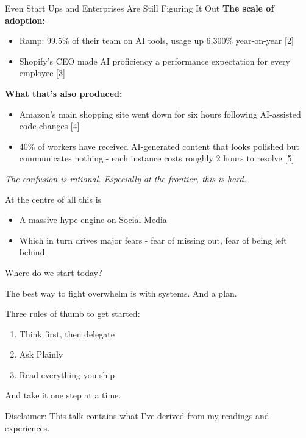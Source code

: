 \documentclass{beamer}
\begin{document}
\begin{frame}{Even Start Ups and Enterprises Are Still Figuring It Out}
\textbf{The scale of adoption:}
\begin{itemize}
    \item Ramp: 99.5\% of their team on AI tools, usage up 6,300\% year-on-year [2]
    \item Shopify's CEO made AI proficiency a performance expectation for every employee [3]
\end{itemize}

\vspace{1em}
\textbf{What that's also produced:}
\begin{itemize}
    \item Amazon's main shopping site went down for six hours following AI-assisted code changes [4]
    \item 40\% of workers have received AI-generated content that looks polished but communicates nothing - each instance costs roughly 2 hours to resolve [5]
\end{itemize}

\vspace{0.8em}
\textit{The confusion is rational. Especially at the frontier, this is hard.}
\end{frame}

\begin{frame}{At the centre of all this is}

\pause
\begin{itemize}
    \item    A massive hype engine on Social Media
    \pause
    \item    Which in turn drives major fears - fear of missing out, fear of being left behind
\end{itemize}

\end{frame}

\begin{frame}{Where do we start today?}

\normalsize
The best way to fight overwhelm is with systems. And a plan.

\normalsize
\pause
\vspace{1em}
\small
Three rules of thumb to get started:
\vspace{1em}
\pause
\begin{enumerate}
    \item Think first, then delegate
    \pause
    \item Ask Plainly
    \pause
    \item Read everything you ship
\end{enumerate}

\pause
And take it one step at a time.


\vspace{0.6em}

\pause
\break
Disclaimer: This talk contains what I've derived from my readings and experiences. 
\end{frame}
\end{document}
